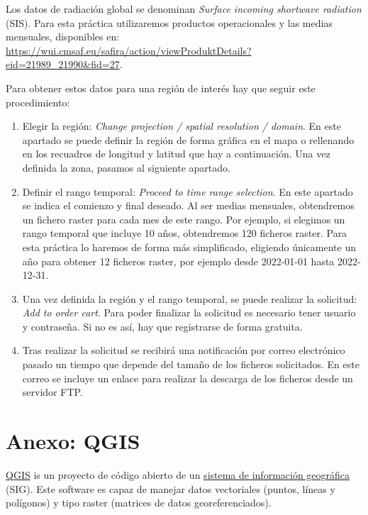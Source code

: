 \documentclass[11pt]{article}
\begin{document}
Los datos de radiación global se denominan \emph{Surface incoming
  shortwave radiation} (SIS). Para esta práctica utilizaremos
productos operacionales y las medias mensuales, disponibles
en:
\url{https://wui.cmsaf.eu/safira/action/viewProduktDetails?eid=21989_21990&fid=27}.

Para obtener estos datos para una región de interés hay que seguir
este procedimiento:
\begin{enumerate}
\item Elegir la región: \emph{Change projection / spatial resolution /
    domain}. En este apartado se puede definir la región de forma
  gráfica en el mapa o rellenando en los recuadros de longitud y
  latitud que hay a continuación. Una vez definida la zona, pasamos al
  siguiente apartado.
\item Definir el rango temporal: \emph{Proceed to time range
    selection}. En este apartado se indica el comienzo y final
  deseado. Al ser medias mensuales, obtendremos un fichero raster para
  cada mes de este rango. Por ejemplo, si elegimos un rango temporal
  que incluye 10 años, obtendremos 120 ficheros raster. Para esta
  práctica lo haremos de forma más simplificado, eligiendo únicamente
  un año para obtener 12 ficheros raster, por ejemplo desde 2022-01-01
  hasta 2022-12-31.
\item Una vez definida la región y el rango temporal, se puede
  realizar la solicitud: \emph{Add to order cart}. Para poder
  finalizar la solicitud es necesario tener usuario y contraseña. Si
  no es así, hay que registrarse de forma gratuita.
\item Tras realizar la solicitud se recibirá una notificación por
  correo electrónico pasado un tiempo que depende del tamaño de los
  ficheros solicitados. En este correo se incluye un enlace para
  realizar la descarga de los ficheros desde un servidor FTP.
\end{enumerate}

\section{Anexo: QGIS}
\label{sec:qgis}

\href{https://qgis.org/es/site/}{QGIS} is un proyecto de código
abierto de
un
\href{https://es.wikipedia.org/wiki/Sistema\_de\_informaci\%C3\%B3n\_geogr\%C3\%A1fica}{sistema
  de información geográfica} (SIG). Este software es capaz de manejar
datos vectoriales (puntos, líneas y polígonos) y tipo raster (matrices
de datos georeferenciados).
\end{document}
